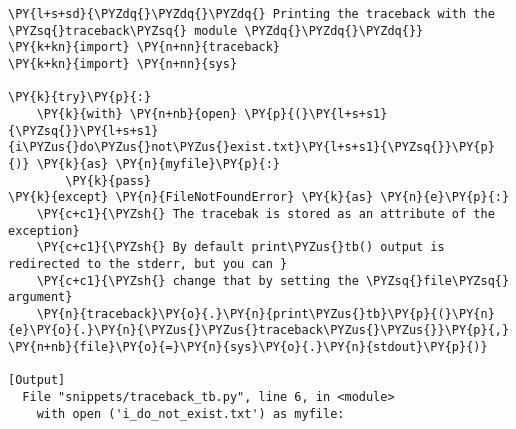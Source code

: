 \begin{Verbatim}[label=\makebox{\url{https://github.com/lucabaldini/cmepda/tree/master/slides/latex/snippets/traceback\_tb.py}},commandchars=\\\{\}]
\PY{l+s+sd}{\PYZdq{}\PYZdq{}\PYZdq{} Printing the traceback with the \PYZsq{}traceback\PYZsq{} module \PYZdq{}\PYZdq{}\PYZdq{}}
\PY{k+kn}{import} \PY{n+nn}{traceback}
\PY{k+kn}{import} \PY{n+nn}{sys}

\PY{k}{try}\PY{p}{:}
    \PY{k}{with} \PY{n+nb}{open} \PY{p}{(}\PY{l+s+s1}{\PYZsq{}}\PY{l+s+s1}{i\PYZus{}do\PYZus{}not\PYZus{}exist.txt}\PY{l+s+s1}{\PYZsq{}}\PY{p}{)} \PY{k}{as} \PY{n}{myfile}\PY{p}{:}
        \PY{k}{pass}
\PY{k}{except} \PY{n}{FileNotFoundError} \PY{k}{as} \PY{n}{e}\PY{p}{:}
    \PY{c+c1}{\PYZsh{} The tracebak is stored as an attribute of the exception}
    \PY{c+c1}{\PYZsh{} By default print\PYZus{}tb() output is redirected to the stderr, but you can }
    \PY{c+c1}{\PYZsh{} change that by setting the \PYZsq{}file\PYZsq{} argument}
    \PY{n}{traceback}\PY{o}{.}\PY{n}{print\PYZus{}tb}\PY{p}{(}\PY{n}{e}\PY{o}{.}\PY{n}{\PYZus{}\PYZus{}traceback\PYZus{}\PYZus{}}\PY{p}{,} \PY{n+nb}{file}\PY{o}{=}\PY{n}{sys}\PY{o}{.}\PY{n}{stdout}\PY{p}{)}

[Output]
  File "snippets/traceback_tb.py", line 6, in <module>
    with open ('i_do_not_exist.txt') as myfile:
\end{Verbatim}